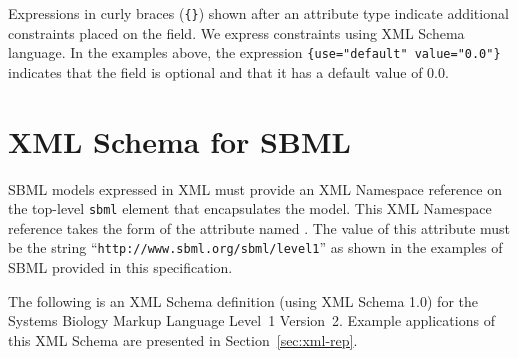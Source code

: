 \documentclass[10pt]{cekarticle}
\newcommand{\changed}[1]{\textcolor{BrickRed}{#1}}
\newenvironment{blockChanged}{\color{BrickRed}}{}
\begin{document}
Expressions in curly braces (\texttt{\{\}}) shown after an attribute type
indicate additional constraints placed on the field.  We express constraints
using XML Schema language.  In the examples above, the expression
\texttt{\{use="default" value="0.0"\}} indicates that the field 
is optional and that it has a default value of $0.0$.



\section{XML Schema for SBML}
\label{apdx:schemas}

\begin{blockChanged}
  SBML models expressed in XML must provide an XML Namespace reference on
  the top-level \texttt{sbml} element that encapsulates the model.  This
  XML Namespace reference takes the form of the attribute named
  .  The value of this attribute must be the string
  ``\texttt{http://www.sbml.org/sbml/level1}'' as shown in the examples of
  SBML provided in this specification.
\end{blockChanged}

The following is an XML Schema definition (using XML Schema 1.0) for the
Systems Biology Markup Language Level~1 \changed{Version~2}.  Example
applications of this XML Schema are presented in Section~\ref{sec:xml-rep}.
\end{document}
